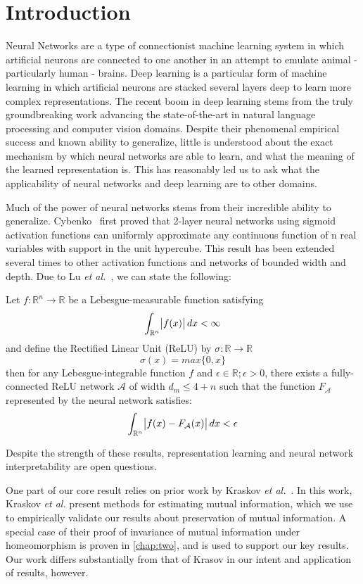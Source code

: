 \chapter{Introduction}
\label{chap:intro}

Neural Networks are a type of connectionist machine learning system in which artificial neurons are connected to one another in an attempt to emulate animal - particularly human - brains.
Deep learning is a particular form of machine learning in which artificial neurons are stacked several layers deep to learn more complex representations. 
The recent boom in deep learning stems from the truly groundbreaking work advancing the state-of-the-art in natural language processing and computer vision domains.
Despite their phenomenal empirical success and known ability to generalize, little is understood about the exact mechanism by which neural networks are able to learn, and what the meaning of the learned representation is.
This has reasonably led us to ask what the applicability of neural networks and deep learning are to other domains.

Much of the power of neural networks stems from their incredible ability to generalize.
Cybenko~\cite{cybenko1989approximation} first proved that 2-layer neural networks using sigmoid activation functions can uniformly approximate any continuous function of n real variables with support in the unit hypercube.
This result has been extended several times to other activation functions and networks of bounded width and depth. 
Due to Lu \textit{et al.}~\cite{lu2017expressive}, we can state the following:

\begin{theorem}
Let $f: \mathbb{R}^n \to \mathbb{R}$ be a Lebesgue-measurable function satisfying
$$\int_{\mathbb{R}^n} \abs{f(x)} dx < \infty$$
and define the Rectified Linear Unit (ReLU) by $\sigma: \mathbb{R} \to \mathbb{R}$ 
$$\sigma(x) = max\{0, x\}$$
then for any Lebesgue-integrable function $f$ and $\epsilon \in \mathbb{R}; \epsilon > 0$, there exists a fully-connected ReLU network $\mathcal{A}$ of width $d_m \leq 4 + n$ such that the function $F_{\mathcal{A}}$ represented by the neural network satisfies:
$$\int_{\mathbb{R}^n} \abs{f(x) - F_{\mathcal{A}}(x)}dx < \epsilon$$
\end{theorem}

Despite the strength of these results, representation learning and neural network interpretability are open questions.


One part of our core result relies on prior work by Kraskov \textit{et al.}~\cite{kraskov2004estimating}. 
In this work, Kraskov \textit{et al.} present methods for estimating mutual information, which we use to empirically validate our results about preservation of mutual information.
A special case of their proof of invariance of mutual information under homeomorphism is proven in \ref{chap:two}, and is used to support our key results.
Our work differs substantially from that of Krasov in our intent and application of results, however.

